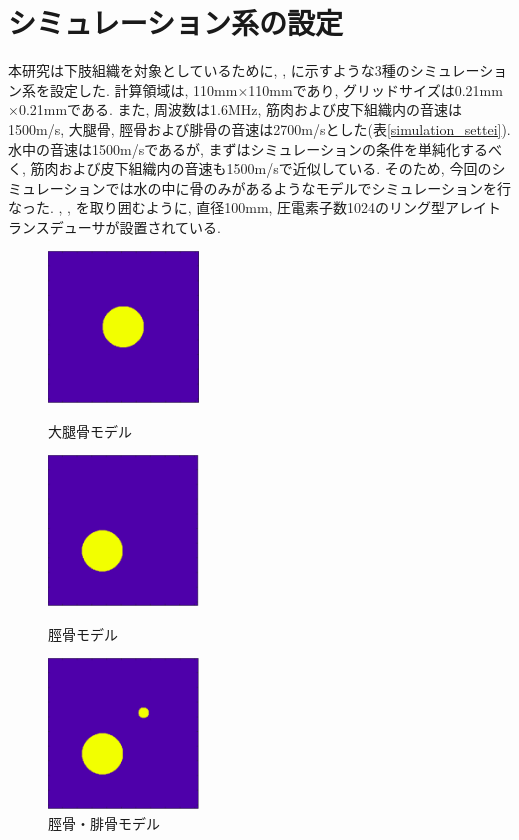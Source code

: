 \section{シミュレーション系の設定}
本研究は下肢組織を対象としているために, ,  に示すような3種のシミュレーション系を設定した. 計算領域は, 110mm$\times$110mmであり, グリッドサイズは0.21mm$\times$0.21mmである. また, 周波数は1.6MHz, 筋肉および皮下組織内の音速は1500m/s, 大腿骨, 脛骨および腓骨の音速は2700m/sとした(表\ref{simulation_settei}). 水中の音速は1500m/sであるが, まずはシミュレーションの条件を単純化するべく, 筋肉および皮下組織内の音速も1500m/sで近似している. そのため, 今回のシミュレーションでは水の中に骨のみがあるようなモデルでシミュレーションを行なった. , ,  を取り囲むように, 直径100mm, 圧電素子数1024のリング型アレイトランスデューサが設置されている. 
\begin{figure}[H]
 \begin{minipage}{0.325\hsize}
  \begin{center}
   \includegraphics[width=40mm]{fig/daitai.pdf}
  \end{center}
  \caption{大腿骨モデル}
 \end{minipage}
 \begin{minipage}{0.325\hsize}
 \begin{center}
  \includegraphics[width=40mm]{fig/keikotsu.pdf}
 \end{center}
  \caption{脛骨モデル}
 \end{minipage}
 \begin{minipage}{0.325\hsize}
 \begin{center}
  \includegraphics[width=40mm]{fig/hikotsu.pdf}
 \end{center}
  \caption{脛骨・腓骨モデル}
 \end{minipage}
\end{figure}
